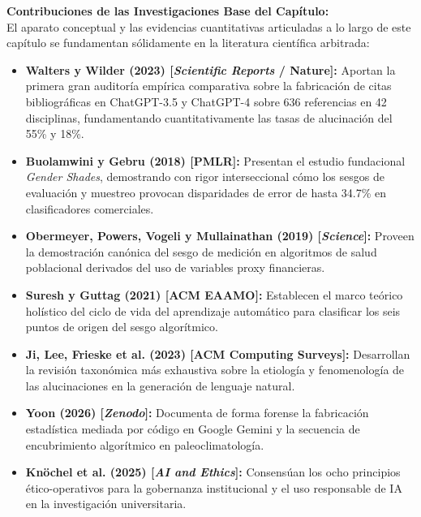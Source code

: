 \textbf{Contribuciones de las Investigaciones Base del Capítulo:}\\[0.2cm]
El aparato conceptual y las evidencias cuantitativas articuladas a lo largo de este capítulo se fundamentan sólidamente en la literatura científica arbitrada:
\begin{itemize}
    \item \textbf{Walters y Wilder (2023) [\textit{Scientific Reports} / Nature]:} Aportan la primera gran auditoría empírica comparativa sobre la fabricación de citas bibliográficas en ChatGPT-3.5 y ChatGPT-4 sobre 636 referencias en 42 disciplinas, fundamentando cuantitativamente las tasas de alucinación del 55\% y 18\%.
    \item \textbf{Buolamwini y Gebru (2018) [PMLR]:} Presentan el estudio fundacional \textit{Gender Shades}, demostrando con rigor interseccional cómo los sesgos de evaluación y muestreo provocan disparidades de error de hasta 34.7\% en clasificadores comerciales.
    \item \textbf{Obermeyer, Powers, Vogeli y Mullainathan (2019) [\textit{Science}]:} Proveen la demostración canónica del sesgo de medición en algoritmos de salud poblacional derivados del uso de variables proxy financieras.
    \item \textbf{Suresh y Guttag (2021) [ACM EAAMO]:} Establecen el marco teórico holístico del ciclo de vida del aprendizaje automático para clasificar los seis puntos de origen del sesgo algorítmico.
    \item \textbf{Ji, Lee, Frieske et al. (2023) [ACM Computing Surveys]:} Desarrollan la revisión taxonómica más exhaustiva sobre la etiología y fenomenología de las alucinaciones en la generación de lenguaje natural.
    \item \textbf{Yoon (2026) [\textit{Zenodo}]:} Documenta de forma forense la fabricación estadística mediada por código en Google Gemini y la secuencia de encubrimiento algorítmico en paleoclimatología.
    \item \textbf{Knöchel et al. (2025) [\textit{AI and Ethics}]:} Consensúan los ocho principios ético-operativos para la gobernanza institucional y el uso responsable de IA en la investigación universitaria.
\end{itemize}
\vspace{0.4cm}

